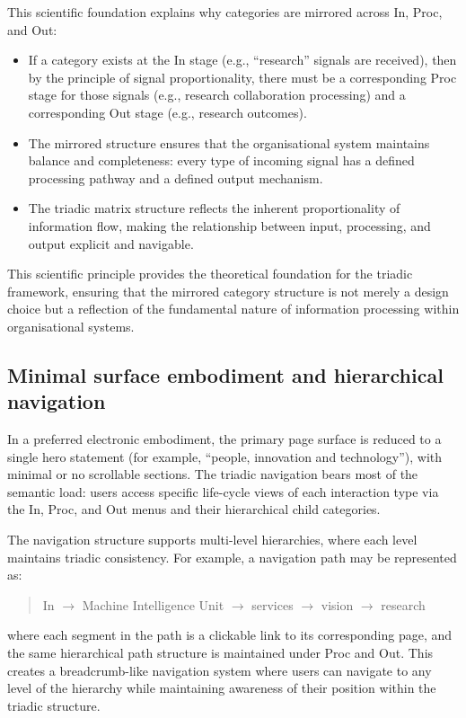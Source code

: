 \documentclass[11pt,a4paper]{article}
\begin{document}
This scientific foundation explains why categories are mirrored across In, Proc, and Out:
\begin{itemize}[noitemsep]
  \item If a category exists at the In stage (e.g., ``research'' signals are received), then by the principle of signal proportionality, there must be a corresponding Proc stage for those signals (e.g., research collaboration processing) and a corresponding Out stage (e.g., research outcomes).
  \item The mirrored structure ensures that the organisational system maintains balance and completeness: every type of incoming signal has a defined processing pathway and a defined output mechanism.
  \item The triadic matrix structure reflects the inherent proportionality of information flow, making the relationship between input, processing, and output explicit and navigable.
\end{itemize}

This scientific principle provides the theoretical foundation for the triadic framework, ensuring that the mirrored category structure is not merely a design choice but a reflection of the fundamental nature of information processing within organisational systems.

\subsection*{Minimal surface embodiment and hierarchical navigation}

In a preferred electronic embodiment, the primary page surface is reduced to a single hero statement (for example, ``people, innovation and technology''), with minimal or no scrollable sections. The triadic navigation bears most of the semantic load: users access specific life-cycle views of each interaction type via the In, Proc, and Out menus and their hierarchical child categories.

The navigation structure supports multi-level hierarchies, where each level maintains triadic consistency. For example, a navigation path may be represented as:
\begin{quote}
In $\rightarrow$ Machine Intelligence Unit $\rightarrow$ services $\rightarrow$ vision $\rightarrow$ research
\end{quote}
where each segment in the path is a clickable link to its corresponding page, and the same hierarchical path structure is maintained under Proc and Out. This creates a breadcrumb-like navigation system where users can navigate to any level of the hierarchy while maintaining awareness of their position within the triadic structure.
\end{document}
